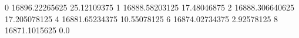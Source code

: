 0 16896.22265625 25.12109375
1 16888.58203125 17.48046875
2 16888.306640625 17.205078125
4 16881.65234375 10.55078125
6 16874.02734375 2.92578125
8 16871.1015625 0.0
